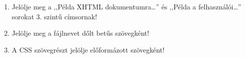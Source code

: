 \begin{frame}
\begin{columns}[c]
\begin{enumerate}
        \item Jelölje meg a ,,Példa XHTML dokumentumra\dots'' és ,,Példa a felhasználói\dots'' sorokat 3. szintű címsornak!
        \item Jelölje meg a fájlnevet dőlt betűs szövegként!
        \item A CSS szövegrészt jelölje előformázott szövegként!
        \setcounter{feladatSzamlalo}{\theenumi}
      \end{enumerate}
  \end{columns}
\end{frame}
